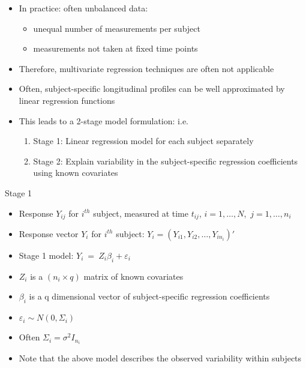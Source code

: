 \documentclass{beamer}
\begin{document}
\begin{frame}
\begin{itemize}
\item In practice: often unbalanced data:
\begin{itemize}
\item  unequal number of measurements per subject
\item measurements not taken at  fixed time points
\end{itemize}
\item Therefore, multivariate regression techniques are often not applicable
\item Often,  subject-specific longitudinal profiles can be well approximated by  linear regression functions
\item This leads to a 2-stage model formulation: i.e.
\begin{enumerate}
\item Stage 1: Linear regression model for each subject separately
\item Stage 2: Explain variability in the subject-specific regression coefficients using known covariates
\end{enumerate}
\end{itemize}
\end{frame}

\begin{frame}{Stage 1}
\begin {itemize}
\item Response  $Y_{ij}$ for $i^{th}$ subject, measured at time $t_{ij}$, $i=1,\ldots,N$,\
$j=1,\ldots,n_i$

\item Response vector $Y_{i}$ for $i^{th}$ subject: \hspace*{1cm} $Y_{i} = (Y_{i 1}, Y_{i 2}, \ldots, Y_{i n_{i}})'$

\item Stage 1 model: $Y_{i} \ = \  Z_{i} \beta_{i} + \varepsilon_{i}$

\item $ Z_{i}$ is a $(n_i \times q)$ matrix of known covariates \\

\item $ \beta_{i} $ is a  q  dimensional vector of subject-specific regression coefficients \\

\item $\varepsilon_{i} \sim N(0, \Sigma_{i})$ \\
\item Often $\Sigma_{i}= \sigma^{2} I_{n_{i}}$
\item Note that the above model describes the observed variability within subjects
\end {itemize}

\end{frame}
\end{document}
